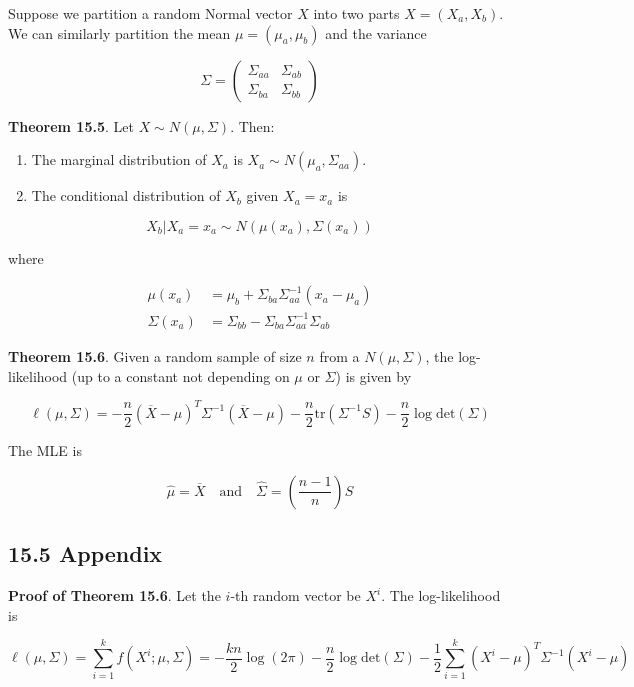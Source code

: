Suppose we partition a random Normal vector \(X\) into two parts
\(X = (X_a, X_b)\). We can similarly partition the mean
\(\mu = (\mu_a, \mu_b)\) and the variance

\[\Sigma = \begin{pmatrix} 
\Sigma_{aa} & \Sigma_{ab} \\
\Sigma_{ba} & \Sigma_{bb}
\end{pmatrix}\]

\textbf{Theorem 15.5}. Let \(X \sim N(\mu, \Sigma)\). Then:

\begin{enumerate}[tightlist,label={\arabic*.}]
\item
  The marginal distribution of \(X_a\) is
  \(X_a \sim N(\mu_a, \Sigma_{aa})\).
\item
  The conditional distribution of \(X_b\) given \(X_a = x_a\) is
\end{enumerate}

\[ X_b | X_a = x_a \sim N(\mu(x_a), \Sigma(x_a))\]

where

\begin{align*}
\mu(x_a) &= \mu_b + \Sigma_{ba} \Sigma_{aa}^{-1} (x_a - \mu_a) \\
\Sigma(x_a) &= \Sigma_{bb} - \Sigma_{ba}\Sigma_{aa}^{-1}\Sigma_{ab}
\end{align*}

\textbf{Theorem 15.6}. Given a random sample of size \(n\) from a
\(N(\mu, \Sigma)\), the log-likelihood (up to a constant not depending
on \(\mu\) or \(\Sigma\)) is given by

\[\ell(\mu, \Sigma) = -\frac{n}{2} (\overline{X} - \mu)^T \Sigma^{-1} (\overline{X} - \mu) - \frac{n}{2} \text{tr} \left( \Sigma^{-1}S \right) - \frac{n}{2} \log \text{det} \left( \Sigma \right) \]

The MLE is

\[ \hat{\mu} = \overline{X} 
\quad \text{and} \quad
\hat{\Sigma} = \left( \frac{n - 1}{n} \right) S\]

\subsection*{15.5 Appendix}\label{appendix:multivariate}

\textbf{Proof of Theorem 15.6}. Let the \(i\)-th random vector be
\(X^{i}\). The log-likelihood is

\[\ell(\mu, \Sigma) = \sum_{i = 1}^{k} f(X^{i}; \mu, \Sigma) 
= -\frac{kn}{2} \log ( 2\pi ) - \frac{n}{2} \log \text{det} \left( \Sigma \right)
- \frac{1}{2} \sum_{i=1}^{k} (X^{i} - \mu)^T \Sigma^{-1} (X^{i} - \mu)
\]

